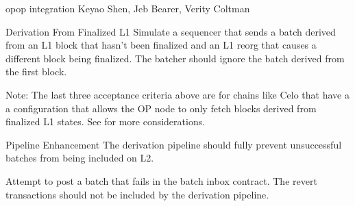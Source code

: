 \begin{requirementspage}{op}{op integration}{
    Keyao Shen, Jeb Bearer, Verity Coltman
}
\begin{requirement}{Derivation From Finalized L1}
        \acceptance Simulate a sequencer that sends a batch derived from an L1 block that hasn't
        been finalized and an L1 reorg that causes a different block being finalized. The batcher
        should ignore the batch derived from the first block.

        Note: The last three acceptance criteria above are for chains like Celo that have a
        a configuration that allows the OP node to only fetch blocks derived from finalized L1
        states. See  for more
        considerations.

    \end{requirement}

    \begin{requirement}{Pipeline Enhancement}
        The derivation pipeline should fully prevent unsuccessful batches from being included on L2.

        \acceptance Attempt to post a batch that fails in the batch inbox contract. The revert
        transactions should not be included by the derivation pipeline.
    \end{requirement}

\end{requirementspage}
